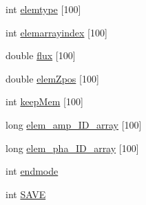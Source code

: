\begin{DoxyCompactItemize}
\item 
int \hyperlink{structOPTSYST_a63f311eb16fa637a8e1cd2102540c67d}{elemtype} \mbox{[}100\mbox{]}
\item 
int \hyperlink{structOPTSYST_a32962b27534c2f242eeb7183237f319f}{elemarrayindex} \mbox{[}100\mbox{]}
\item 
double \hyperlink{structOPTSYST_a50cc581680a3ba2856a0ba03f1ea97c0}{flux} \mbox{[}100\mbox{]}
\item 
double \hyperlink{structOPTSYST_a80079ae1f8045368a8e009e4ceda76a1}{elem\+Zpos} \mbox{[}100\mbox{]}
\item 
int \hyperlink{structOPTSYST_a542117d96bcee0d0787417101c5f9664}{keep\+Mem} \mbox{[}100\mbox{]}
\item 
long \hyperlink{structOPTSYST_a0d0a44c7ffab65020c28c6b64668ebf4}{elem\+\_\+amp\+\_\+\+I\+D\+\_\+array} \mbox{[}100\mbox{]}
\item 
long \hyperlink{structOPTSYST_ae568b4a9a7cb9030a0e2a513ab4ade4a}{elem\+\_\+pha\+\_\+\+I\+D\+\_\+array} \mbox{[}100\mbox{]}
\item 
int \hyperlink{structOPTSYST_a98b8c66b45d6534f830d5cfe9fb39b17}{endmode}
\item 
int \hyperlink{structOPTSYST_a1edeacc3267a9dae94f74a7ae2d5d668}{S\+A\+V\+E}
\end{DoxyCompactItemize}



